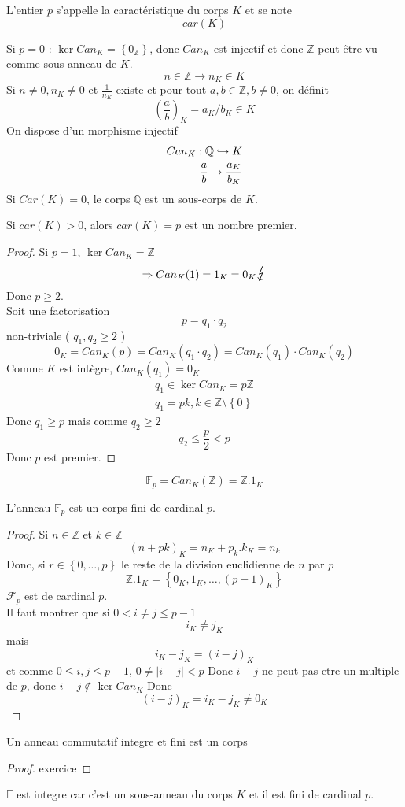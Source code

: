 \documentclass[../main.tex]{subfiles}
\begin{document}
\begin{defn}[Caractéristique]\label{defn:caracteristique}
	L'entier $p$ s'appelle la caractéristique du corps $K$ et se note
	\[ 
		car(K)
	\]
\end{defn}
Si $p=0$ : $\ker Can_K = \left\{ 0_\mathbb{Z} \right\} $, donc $Can_K$ est injectif et donc $\mathbb{Z}$ peut être vu comme sous-anneau de $K$.
\[ 
n \in \mathbb{Z} \to n_K \in K
\]
Si $n \neq 0, n_K \neq 0$ et $\frac{1}{n_K}$ existe et pour tout $a,b \in \mathbb{Z},b \neq 0$, on définit 
\[ 
	( \frac{a}{b})_K = a_K /b_K \in K
\]
On dispose d'un morphisme injectif
\begin{align*}
Can_K : \mathbb{Q} \hookrightarrow K\\
\frac{a}{b} \to \frac{a_K}{b_K}
\end{align*}
Si $Car(K) = 0$, le corps $\mathbb{Q}$ est un sous-corps de $K$.
\begin{lemma}
	Si $car(K) > 0 $, alors $car(K)=p$ est un nombre premier.
\end{lemma}
\begin{proof}
Si $p=1$, $\ker Can_K = \mathbb{Z}$ 
\[ 
	\Rightarrow Can_K ( 1) = 1_K =0_K \contra
\]
Donc $p\geq 2$.\\
Soit une factorisation 
\[ 
p=q_1\cdot q_2
\]
non-triviale ( $ q_1,q_2 \geq 2$ )
\[ 
	0_K=Can_K(p) = Can_K(q_1\cdot q_2) = Can_K(q_1) \cdot Can_K(q_2)
\]
Comme $K$ est intègre, $Can_K(q_1) = 0_K$
\begin{align*}
q_1 \in \ker Can_K = p \mathbb{Z}\\
q_1 = pk, k \in \mathbb{Z}\setminus \left\{ 0 \right\} 
\end{align*}
Donc $q_1\geq p$ mais comme $q_2 \geq 2	$
\[ 
q_2 \leq \frac{p}{2} < p
\]
Donc $p$ est premier.
\end{proof}
\begin{defn}
\[ 
	\mathbb{F}_p = Can_K(\mathbb{Z}) = \mathbb{Z}.1_K
\]

\end{defn}
\begin{lemma}
	L'anneau $\mathbb{F}_p$ est un corps fini de cardinal $p$.
\end{lemma}
\begin{proof}
Si $n\in \mathbb{Z}$ et $k \in \mathbb{Z}$ 
\[ 
	( n+pk)_K = n_K + p_k . k_K = n_k
\]
Donc, si $r \in \left\{ 0, \ldots, p \right\} $ le reste de la division euclidienne de $n$ par $p$
\[ 
	\mathbb{Z}.1_K =  \left\{ 0_K, 1_K, \ldots, ( p-1)_K \right\} 
\]
$\mathcal{F}_p$ est de cardinal $p$.\\
Il faut montrer que si $0<i \neq j \leq p-1$ 
\[ 
i_K \neq j_K
\]
mais 
\[ 
	i_K - j_K = ( i-j)_K
\]
et comme $0 \leq i,j \leq p-1$, $0 \neq |i-j| < p$
Donc $i-j$ ne peut pas etre un multiple de $p$, donc $i-j \notin \ker Can_K$
Donc 
\[ 
	( i-j)_K = i_K - j_K \neq 0_K
\]

\end{proof}
\begin{lemma}
	Un anneau commutatif integre et fini est un corps
\end{lemma}
\begin{proof}
exercice
\end{proof}
$\mathbb{F}$ est integre car c'est un sous-anneau du corps $K$ et il est fini de cardinal  $p$.
\end{document}
